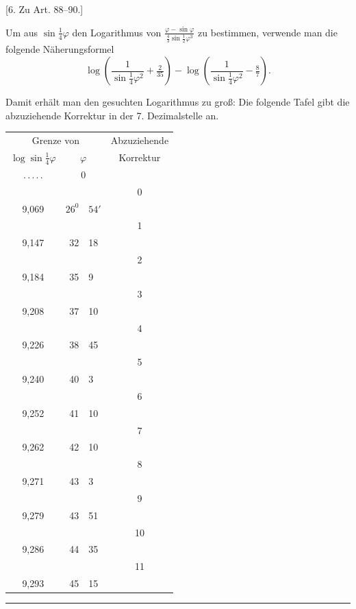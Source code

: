 \begin{center}
[6. Zu Art. 88–90.]
\end{center}
Um aus \(\sin\tfrac14\varphi\) den Logarithmus von \(\frac{\varphi-\sin\varphi}{\tfrac43\sin\tfrac12\varphi^3}\) zu bestimmen, verwende man die folgende Näherungsformel
\[
\log\left(\frac{1}{\sin\tfrac14\varphi^2}+\tfrac{2}{35}\right)-\log\left(\frac{1}{\sin\tfrac14\varphi^2}-\tfrac87\right).
\]

Damit erhält man den gesuchten Logarithmus zu groß: Die folgende Tafel gibt die abzuziehende Korrektur in der 7. Dezimalstelle an.
\begin{center}
\begingroup\renewcommand{\arraystretch}{.7}
\begin{tabular}{c|r@{\ }l|c}
\multicolumn{3}{c|}{Grenze von}&Abzuziehende\\
\(\log\sin\tfrac14\varphi\)&\multicolumn{2}{c|}{\(\varphi\)}&Korrektur\\[1.2pt]
\hline
.\,.\,.\,.\,.&\multicolumn{2}{c|}{\rule{0pt}{9pt}0}&\\
&&&0\\
9,069&\(26^0\)&\(54'\)&\\
&&&1\\
9,147&32&18&\\
&&&2\\
9,184&35&9&\\
&&&3\\
9,208&37&10&\\
&&&4\\
9,226&38&45&\\
&&&5\\
9,240&40&3&\\
&&&6\\
9,252&41&10&\\
&&&7\\
9,262&42&10&\\
&&&8\\
9,271&43&3&\\
&&&9\\
9,279&43&51&\\
&&&10\\
9,286&44&35&\\
&&&11\\
9,293&45&15&
\end{tabular}
\endgroup
\end{center}
\begin{center}\rule{.22\textwidth}{.35pt}\end{center}

